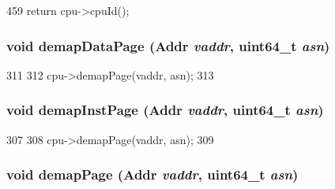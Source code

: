\begin{DoxyCode}
459 { return cpu->cpuId(); }
\end{DoxyCode}
\hypertarget{classBaseDynInst_a26789603cc94992d18f8ddedfff96acf}{
\subsubsection[{demapDataPage}]{\setlength{\rightskip}{0pt plus 5cm}void demapDataPage ({\bf Addr} {\em vaddr}, \/  uint64\_\-t {\em asn})}}
\label{classBaseDynInst_a26789603cc94992d18f8ddedfff96acf}



\begin{DoxyCode}
311     {
312         cpu->demapPage(vaddr, asn);
313     }
\end{DoxyCode}
\hypertarget{classBaseDynInst_ac8a36d45a839b07f50b73f1eee119615}{
\subsubsection[{demapInstPage}]{\setlength{\rightskip}{0pt plus 5cm}void demapInstPage ({\bf Addr} {\em vaddr}, \/  uint64\_\-t {\em asn})}}
\label{classBaseDynInst_ac8a36d45a839b07f50b73f1eee119615}



\begin{DoxyCode}
307     {
308         cpu->demapPage(vaddr, asn);
309     }
\end{DoxyCode}
\hypertarget{classBaseDynInst_a2d698ff909513b48a1263f8a5440e067}{
\subsubsection[{demapPage}]{\setlength{\rightskip}{0pt plus 5cm}void demapPage ({\bf Addr} {\em vaddr}, \/  uint64\_\-t {\em asn})}}
\label{classBaseDynInst_a2d698ff909513b48a1263f8a5440e067}



